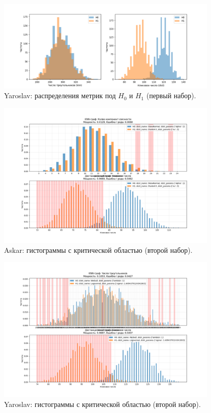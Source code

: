 \documentclass[a4paper,12pt]{article}
\begin{document}
\begin{figure}[H]
    \centering
    \includegraphics[width=0.95\textwidth]{part3_results_0_Yaroslav.png}
    \caption{Yaroslav: распределения метрик под $H_0$ и $H_1$ (первый набор).}
    \label{fig:part3-0-yaroslav}
\end{figure}

\begin{figure}[H]
    \centering
    \includegraphics[width=0.95\textwidth]{part3_results_1_Askar.png}
    \caption{Askar: гистограммы с критической областью (второй набор).}
    \label{fig:part3-1-askar}
\end{figure}

\begin{figure}[H]
    \centering
    \includegraphics[width=0.95\textwidth]{part3_results_1_Yaroslav.png}
    \caption{Yaroslav: гистограммы с критической областью (второй набор).}
    \label{fig:part3-1-yaroslav}
\end{figure}
\end{document}
